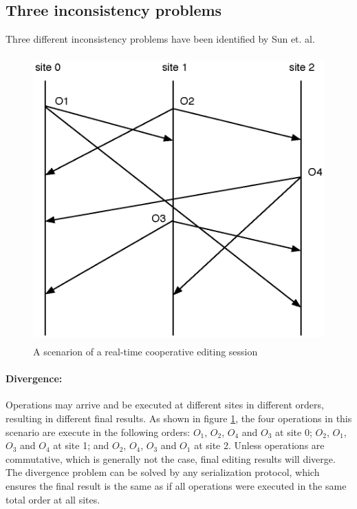 \documentclass[11pt,a4paper]{article}
\begin{document}
\subsection{Three inconsistency problems}
Three different inconsistency problems have been identified by {Sun et. al}\cite{sun98a}.

\begin{figure}
 \centering
 \includegraphics[width=4.68in,height=4.33in]{../../images/example1.eps}
 \caption{A scenarion of a real-time cooperative editing session}
 \label{fig:example1}
\end{figure}

\paragraph{Divergence:}
Operations may arrive and be executed at different sites in different orders, resulting in different final results. As shown in figure \ref{fig:example1}, the four operations in this scenario are execute in the following orders: $O_{1}$, $O_{2}$, $O_{4}$ and $O_{3}$ at site 0; $O_{2}$, $O_{1}$, $O_{3}$ and $O_{4}$ at site 1; and $O_{2}$, $O_{4}$, $O_{3}$ and $O_{1}$ at site 2. Unless operations are commutative, which is generally not the case, final editing results will diverge. The divergence problem can be solved by any serialization protocol, which ensures the final result is the same as if all operations were executed in the same total order at all sites.
\end{document}
